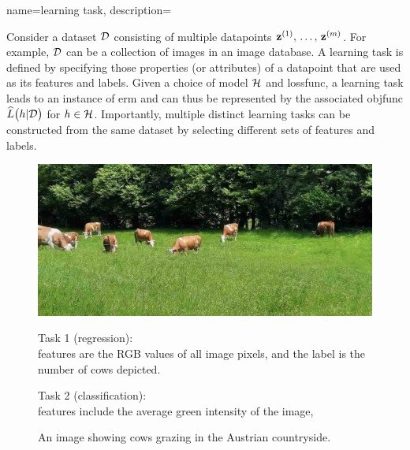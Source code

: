 {name={learning task},
	description={Consider a \gls{dataset} $\mathcal{D}$ consisting of 
		multiple \glspl{datapoint} ${\bf z}^{(1)},\,\ldots,\,{\bf z}^{(m)}$. 
		For example, $\mathcal{D}$ can be a collection of images in an image database. 
		A learning task is defined by specifying those properties (or attributes) of a \gls{datapoint} 
		that are used as its \glspl{feature} and \glspl{label}. Given a choice of \gls{model} $\mathcal{H}$ and 
		\gls{lossfunc}, a learning task leads to an instance of \gls{erm} and can thus be 
		represented by the associated \gls{objfunc} $\widehat{L}\big(h|\mathcal{D}\big)$ for $h \in \mathcal{H}$. 
		Importantly, multiple distinct learning tasks can be constructed from the same \gls{dataset} 
		by selecting different sets of \glspl{feature} and \glspl{label}. 
    		\begin{figure}[H]
			\centering
			\begin{minipage}[t]{0.95\textwidth}
    			\centering
    			\includegraphics[width=\textwidth]{assets/CowsAustria.jpg}
    			\caption*{An image showing cows grazing in the Austrian countryside.}
			\vspace{5mm}
			\end{minipage}
			\vspace{5mm}
			\begin{minipage}[t]{0.45\textwidth}
    			Task 1 (\gls{regression}): \\
        			\Glspl{feature} are the RGB values of all image pixels,
        			and the \gls{label} is the number of cows depicted.
			\end{minipage}
			\hfill
			\begin{minipage}[t]{0.45\textwidth}
    			Task 2 (\gls{classification}): \\
			\Glspl{feature} include the average green intensity of the image, 

\end{minipage}
\end{figure}}}
